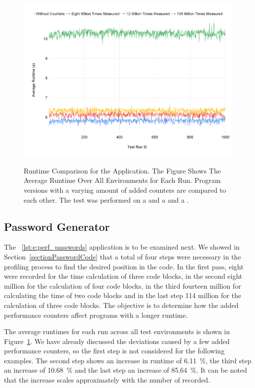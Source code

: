 \begin{figure}[t]
  \centering
  \caption[Runtime Comparison for the \PASSWORDGEN Application.]{Runtime Comparison for the \PASSWORDGEN Application. The Figure Shows The Average Runtime Over All Environments for Each Run. Program versions with a varying amount of added counters are compared to each other. The test was performed on a \IMAC and a \MACBOOK and a \AMD.} 
  \includegraphics[width=1\textwidth]{graphics/e_password_comparison.png}
  \label{fig:e:password_comparison}
\end{figure}

\subsection{Password Generator}
The \PASSWORDGEN~\ref{lst:e:perf_passwords} application is to be examined next. We showed in Section~\ref{sectionPasswordCode} that a total of four steps were necessary in the profiling process to find the desired position in the code. In the first pass, eight \MEASUREVALUES were recorded for the time calculation of three code blocks, in the second eight million for the calculation of four code blocks, in the third fourteen million for calculating the time of two code blocks and in the last step 114 million for the calculation of three code blocks. The objective is to determine how the added performance counters affect programs with a longer runtime.

The average runtimes for each run across all test environments is shown in Figure~\ref{fig:e:password_comparison}. We have already discussed the deviations caused by a few added performance counters, so the first step is not considered for the following examples. The second step shows an increase in runtime of \SI{6.11}{\percent}, the third step an increase of \SI{10.68}{\percent} and the last step an increase of \SI{85.64}{\percent}. It can be noted that the increase scales approximately with the number of \MEASUREVALUES recorded. 

